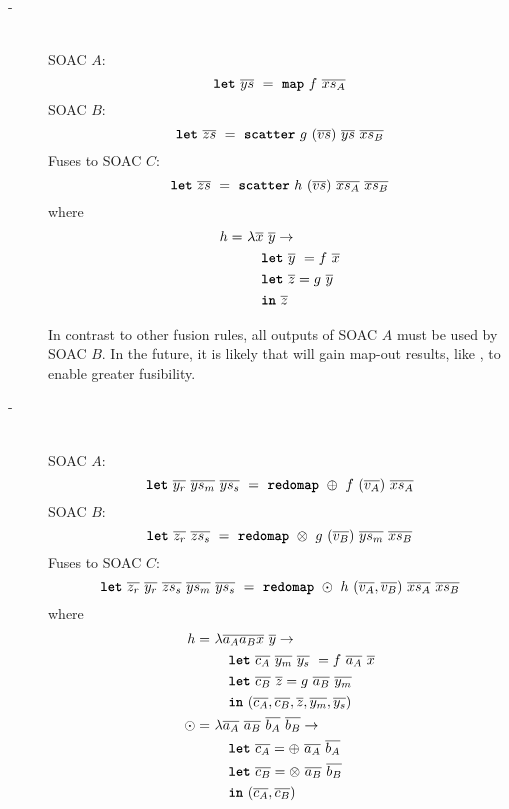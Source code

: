 \begin{description}
\item[-]\hfill\\

  SOAC $A$:
  \[
    \mbox{\texttt{\bfseries{let}}}~\overline{ys}~=~\mbox{\texttt{\bfseries{map}}}~f~\overline{xs_{A}}
  \]
  SOAC $B$:
  \[
    \mbox{\texttt{\bfseries{let}}}~\overline{zs}~=~\mbox{\texttt{\bfseries{scatter}}}~g~(\overline{vs})~\overline{ys}~\overline{xs_{B}}
  \]
  Fuses to SOAC $C$:
  \[
    \mbox{\texttt{\bfseries{let}}}~\overline{zs}~=~\mbox{\texttt{\bfseries{scatter}}}~h~(\overline{vs})~\overline{xs_{A}}~\overline{xs_{B}}
  \]
  where
  \begin{align*}
    h =~& \lambda \overline{x}~\overline{y} \rightarrow \\
      & \quad \mbox{\texttt{\bfseries{let}}}~\overline{y}~ = f~\overline{x} \\
      & \quad \mbox{\texttt{\bfseries{let}}}~\overline{z} = g~\overline{y} \\
      & \quad \mbox{\texttt{\bfseries{in}}}~\overline{z}
  \end{align*}

  In contrast to other fusion rules, all outputs of SOAC $A$ must be
  used by SOAC $B$.  In the future, it is likely that 
  will gain map-out results, like , to enable greater
  fusibility.

\item[-]\hfill\\

  SOAC $A$:
  \[
    \mbox{\texttt{\bfseries{let}}}~\overline{y_{r}}~\overline{ys_{m}}~\overline{ys_{s}}~=~\mbox{\texttt{\bfseries{redomap}}}~\oplus~f~(\overline{v_{A}})~\overline{xs_{A}}
  \]
  SOAC $B$:
  \[
    \mbox{\texttt{\bfseries{let}}}~\overline{z_{r}}~\overline{zs_{s}}~=~\mbox{\texttt{\bfseries{redomap}}}~\otimes~g~(\overline{v_{B}})~\overline{ys_{m}}~\overline{xs_{B}}
  \]
  Fuses to SOAC $C$:
  \[
    \mbox{\texttt{\bfseries{let}}}~\overline{z_{r}}~\overline{y_{r}}~\overline{zs_{s}}~\overline{ys_{m}}~\overline{ys_{s}}~=~\mbox{\texttt{\bfseries{redomap}}}~\odot~h~(\overline{v_{A}},\overline{v_{B}})~\overline{xs_{A}}~\overline{xs_{B}}
  \]
where
  \begin{align*}
    h =~& \lambda \overline{a_{A}} \overline{a_{B}} \overline{x}~\overline{y} \rightarrow \\
      & \quad \mbox{\texttt{\bfseries{let}}}~\overline{c_{A}}~\overline{y_{m}}~\overline{y_{s}}~ = f~\overline{a_{A}}~\overline{x} \\
      & \quad \mbox{\texttt{\bfseries{let}}}~\overline{c_{B}}~\overline{z} = g~\overline{a_{B}}~\overline{y_{m}} \\
        & \quad \mbox{\texttt{\bfseries{in}}}~(\overline{c_{A}},\overline{c_{B}},\overline{z},\overline{y_{m}},\overline{y_{s}}) \\
    \odot =~& \lambda \overline{a_{A}}~\overline{a_{B}}~\overline{b_{A}}~\overline{b_{B}} \rightarrow \\
        & \quad \mbox{\texttt{\bfseries{let}}}~\overline{c_{A}} = \oplus~\overline{a_{A}}~\overline{b_{A}} \\
        & \quad \mbox{\texttt{\bfseries{let}}}~\overline{c_{B}} = \otimes~\overline{a_{B}}~\overline{b_{B}} \\
        & \quad \mbox{\texttt{\bfseries{in}}}~(\overline{c_{A}}, \overline{c_{B}})
  \end{align*}


\end{description}
